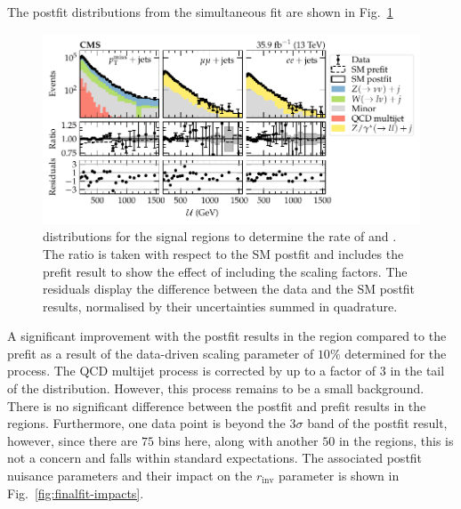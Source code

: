 The postfit distributions from the simultaneous fit are shown in Fig.~\ref{fig:finalfit-postfit}
%
\begin{figure}
    \centering
    \includegraphics{chapters/043_results/images/finalfit-postfit.pdf}
    \caption[Recoil distributions after a fit to the data between the signal and control regions.]{
        \recoil distributions for the signal regions to determine the rate of \IZvvj and \IZllj. The ratio is taken with respect to the SM postfit and includes the prefit result to show the effect of including the scaling factors. The residuals display the difference between the data and the SM postfit results, normalised by their uncertainties summed in quadrature.
    }
    \label{fig:finalfit-postfit}
\end{figure}
%
A significant improvement with the postfit results in the \ptmissplusjets
region compared to the prefit as a result of the data-driven scaling parameter
of $10\%$ determined for the \IWlvj process. The QCD multijet process is
corrected by up to a factor of $3$ in the tail of the \recoil distribution.
However, this process remains to be a small background. There is no
significant difference between the postfit and prefit results in the
\diellplusjets regions. Furthermore, one data point is beyond the $3\sigma$
band of the postfit result, however, since there are $75$ bins here, along
with another $50$ in the \ellplusjets regions, this is not a concern and falls
within standard expectations. The associated postfit nuisance parameters and
their impact on the $r_{\mathrm{inv}}$ parameter is shown in
Fig.~\ref{fig:finalfit-impacts}.
%
